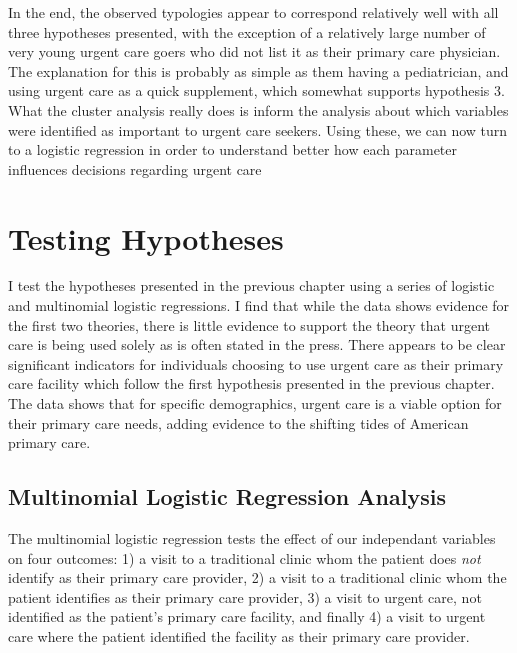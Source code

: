 \documentclass[12pt,twoside]{reedthesis}
\begin{document}
  In the end, the observed typologies appear to correspond relatively well
  with all three hypotheses presented, with the exception of a relatively
  large number of very young urgent care goers who did not list it as
  their primary care physician. The explanation for this is probably as
  simple as them having a pediatrician, and using urgent care as a quick
  supplement, which somewhat supports hypothesis 3. What the cluster
  analysis really does is inform the analysis about which variables were
  identified as important to urgent care seekers. Using these, we can now
  turn to a logistic regression in order to understand better how each
  parameter influences decisions regarding urgent care
  
  \section*{Testing Hypotheses}\label{testing-hypotheses}
  
  I test the hypotheses presented in the previous chapter using a series
  of logistic and multinomial logistic regressions. I find that while the
  data shows evidence for the first two theories, there is little evidence
  to support the theory that urgent care is being used solely as is often
  stated in the press. There appears to be clear significant indicators
  for individuals choosing to use urgent care as their primary care
  facility which follow the first hypothesis presented in the previous
  chapter. The data shows that for specific demographics, urgent care is a
  viable option for their primary care needs, adding evidence to the
  shifting tides of American primary care.
  
  \subsection*{Multinomial Logistic Regression
  Analysis}\label{multinomial-logistic-regression-analysis}
  
  The multinomial logistic regression tests the effect of our independant
  variables on four outcomes: 1) a visit to a traditional clinic whom the
  patient does \emph{not} identify as their primary care provider, 2) a
  visit to a traditional clinic whom the patient identifies as their
  primary care provider, 3) a visit to urgent care, not identified as the
  patient's primary care facility, and finally 4) a visit to urgent care
  where the patient identified the facility as their primary care
  provider.
  
\end{document}
